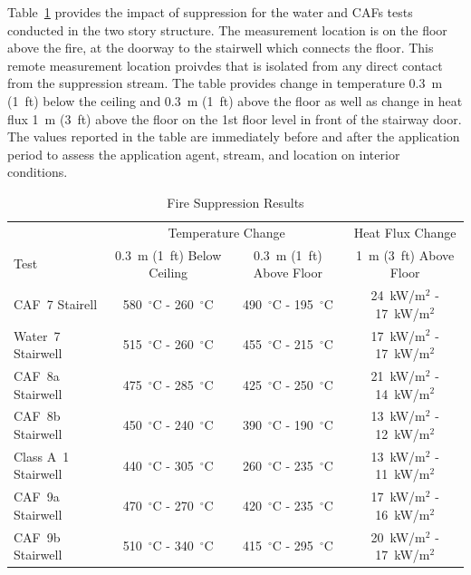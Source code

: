 \documentclass[12pt,oneside]{book}
\begin{document}
Table~\ref{tab:Test_Results_2} provides the impact of suppression for the water and CAFs tests conducted in the two story structure. The measurement location is on the floor above the fire, at the doorway to the stairwell which connects the floor. This remote measurement location proivdes that is isolated from any direct contact from the suppression stream. The table provides change in temperature 0.3~m (1~ft) below the ceiling and 0.3~m (1~ft) above the floor as well as change in heat flux 1~m (3~ft) above the floor on the 1st floor level in front of the stairway door. The values reported in the table are immediately before and after the application period to assess the application agent, stream, and location on interior conditions.

\begin{table}[!ht]
\centering
\caption{Fire Suppression Results}\label{tab:Test_Results_2}
\begin{tabular}{lccc}
\toprule[1.5pt]
                     & \multicolumn{2}{c}{Temperature Change}                                    & Heat Flux Change \\
Test 	             & 0.3~m (1~ft) Below Ceiling          & 0.3~m (1~ft) Above Floor	         & 1~m (3~ft) Above Floor \\
\midrule
CAF~7 Stairell       & 580~$^{\circ}$C - 260~$^{\circ}$C   & 490~$^{\circ}$C - 195~$^{\circ}$C   & 24~kW/m$^2$ - 17~kW/m$^2$  \\[.25cm]
Water~7 Stairwell    & 515~$^{\circ}$C - 260~$^{\circ}$C   & 455~$^{\circ}$C - 215~$^{\circ}$C   & 17~kW/m$^2$ - 17~kW/m$^2$  \\[.25cm]
CAF~8a Stairwell     & 475~$^{\circ}$C - 285~$^{\circ}$C   & 425~$^{\circ}$C - 250~$^{\circ}$C   & 21~kW/m$^2$ - 14~kW/m$^2$  \\
CAF~8b Stairwell     & 450~$^{\circ}$C - 240~$^{\circ}$C   & 390~$^{\circ}$C - 190~$^{\circ}$C   & 13~kW/m$^2$ - 12~kW/m$^2$  \\[.25cm]
Class A~1 Stairwell  & 440~$^{\circ}$C - 305~$^{\circ}$C   & 260~$^{\circ}$C - 235~$^{\circ}$C   & 13~kW/m$^2$ - 11~kW/m$^2$  \\
CAF~9a Stairwell     & 470~$^{\circ}$C - 270~$^{\circ}$C   & 420~$^{\circ}$C - 235~$^{\circ}$C   & 17~kW/m$^2$ - 16~kW/m$^2$  \\
CAF~9b Stairwell     & 510~$^{\circ}$C - 340~$^{\circ}$C   & 415~$^{\circ}$C - 295~$^{\circ}$C   & 20~kW/m$^2$ - 17~kW/m$^2$  \\
\bottomrule[1.25pt]
\end{tabular}\par
\end{table}
\end{document}
